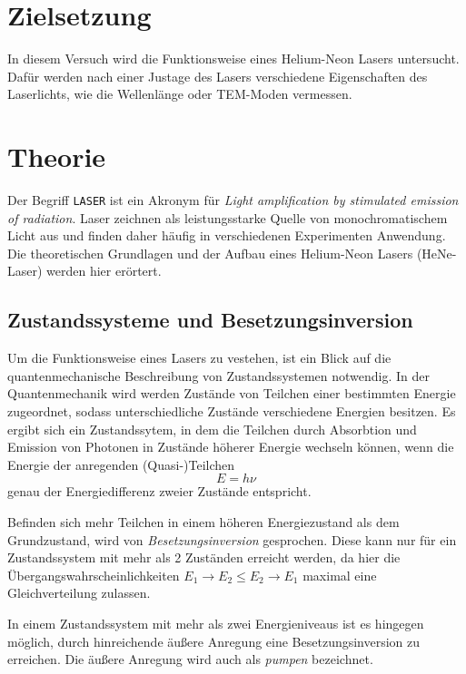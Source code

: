 \section{Zielsetzung}
In diesem Versuch wird die Funktionsweise eines Helium-Neon Lasers untersucht. Dafür werden nach einer Justage des Lasers 
verschiedene Eigenschaften des Laserlichts, wie die Wellenlänge oder TEM-Moden vermessen.

\section{Theorie}
\label{sec:Theorie}

Der Begriff \texttt{LASER} ist ein Akronym für \textit{Light amplification by stimulated emission of radiation}. Laser zeichnen als
leistungsstarke Quelle von monochromatischem Licht aus und finden daher häufig in verschiedenen Experimenten Anwendung. Die theoretischen
Grundlagen und der Aufbau eines Helium-Neon Lasers (HeNe-Laser) werden hier erörtert.

\subsection{Zustandssysteme und Besetzungsinversion}
Um die Funktionsweise eines Lasers zu vestehen, ist ein Blick auf die quantenmechanische Beschreibung von Zustandssystemen notwendig.
In der Quantenmechanik wird werden Zustände von Teilchen einer bestimmten Energie zugeordnet, sodass unterschiedliche Zustände verschiedene
Energien besitzen. Es ergibt sich ein Zustandssytem, in dem die Teilchen durch Absorbtion und Emission von Photonen in Zustände höherer Energie wechseln können,
wenn die Energie der anregenden (Quasi-)Teilchen
\begin{equation}
    E = h\nu
\end{equation}
genau der Energiedifferenz zweier Zustände entspricht.

Befinden sich mehr Teilchen in einem höheren Energiezustand als dem Grundzustand, wird von \textit{Besetzungsinversion} gesprochen. Diese kann
nur für ein Zustandssystem mit mehr als 2 Zuständen erreicht werden, da hier die Übergangswahrscheinlichkeiten $E_1 \rightarrow E_2 ≤ E_2 \rightarrow E_1$
maximal eine Gleichverteilung zulassen.

In einem Zustandssystem mit mehr als zwei Energieniveaus ist es hingegen möglich, durch hinreichende äußere Anregung eine Besetzungsinversion zu erreichen. 
Die äußere Anregung wird auch als \textit{pumpen} bezeichnet.

